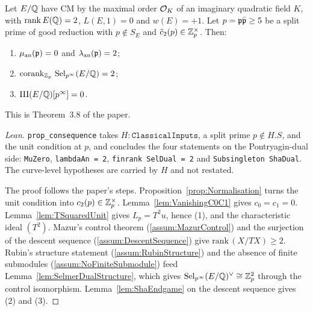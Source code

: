 \begin{theorem}[Theorem A]
  \label{thm:TheoremA}
  \leanok
  Let $E/\mathbb{Q}$ have CM by the maximal order ${\mathcal{O}_K}$ of an imaginary quadratic
  field $K$, with $\operatorname{rank} E(\mathbb{Q}) = 2$, $L(E,1) = 0$ and $w(E) = +1$. Let
  $p = {\mathfrak{p}}\bar{{\mathfrak{p}}} \ge 5$ be a split prime of good reduction with
  $p \notin S_E$ and $\tilde c_2(p) \in \mathbb{Z}_p^\times$. Then:
  \begin{enumerate}
    \item $\mu_{\mathrm{an}}({\mathfrak{p}}) = 0$ and $\lambda_{\mathrm{an}}({\mathfrak{p}}) = 2$;
    \item $\operatorname{corank}_{\mathbb{Z}_p}\, \operatorname{Sel}_{p^\infty}(E/\mathbb{Q}) = 2$;
    \item $\mathrm{III}(E/\mathbb{Q})[p^\infty] = 0$.
  \end{enumerate}
  This is Theorem~3.8 of the paper.
\end{theorem}
\begin{proof}[Lean]
  \leanok
  \texttt{prop\_consequence} takes $H : \texttt{ClassicalInputs}$, a split
  prime $p \notin H.S$, and the unit condition at $p$, and concludes the
  four statements on the Pontryagin-dual side: \texttt{MuZero},
  \texttt{lambdaAn = 2}, \texttt{finrank SelDual = 2} and
  \texttt{Subsingleton ShaDual}. The curve-level hypotheses are carried by
  $H$ and not restated.

  The proof follows the paper's steps. Proposition~\ref{prop:Normalisation}
  turns the unit condition into $c_2(p) \in \mathbb{Z}_p^\times$.
  Lemma~\ref{lem:VanishingC0C1} gives $c_0 = c_1 = 0$.
  Lemma~\ref{lem:TSquaredUnit} gives $L_p = T^2 u$, hence (1), and the
  characteristic ideal $(T^2)$. Mazur's control theorem
  (\ref{assum:MazurControl}) and the surjection of the descent sequence
  (\ref{assum:DescentSequence}) give $\mathrm{rank}\,(X/TX) \ge 2$. Rubin's
  structure statement (\ref{assum:RubinStructure}) and the absence of finite
  submodules (\ref{assum:NoFiniteSubmodule}) feed
  Lemma~\ref{lem:SelmerDualStructure}, which gives
  $\mathrm{Sel}_{p^\infty}(E/\mathbb{Q})^\vee \cong \mathbb{Z}_p^2$ through the control
  isomorphism. Lemma~\ref{lem:ShaEndgame} on the descent sequence gives (2)
  and (3).
\end{proof}

